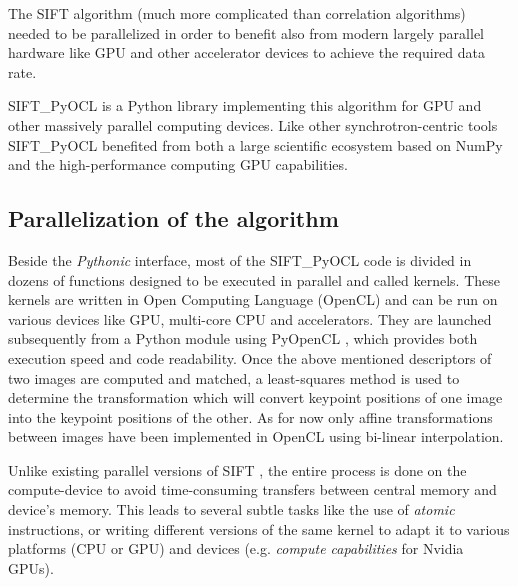 \documentclass[preprint]{iucr}
\begin{document}
The SIFT algorithm (much more complicated than correlation algorithms) needed
to be parallelized in order to benefit also from modern largely parallel
hardware like GPU and other accelerator devices to achieve the required data
rate.

SIFT\_PyOCL is a Python library implementing this algorithm for GPU
and other massively parallel computing devices.
Like other synchrotron-centric tools \cite{pyhst2,pynx,pyfai} SIFT_PyOCL
benefited from both a large scientific ecosystem based on NumPy \cite{numpy}
and the high-performance computing GPU capabilities.





\subsection{Parallelization of the algorithm}
Beside the \emph{Pythonic} interface, most of the
SIFT\_PyOCL code is divided in dozens of functions designed to be
executed in parallel and called kernels. These kernels are written in Open
Computing Language (OpenCL) \cite{opencl} and  can be run on various
devices like GPU, multi-core CPU and accelerators.
They are launched subsequently from a Python module using PyOpenCL
\cite{pyopencl}, which provides both execution speed and code readability.
Once the above mentioned descriptors of two images are computed and matched, a
least-squares method is used to determine the transformation which will convert
keypoint positions of one image into the keypoint positions of the other.
As for now only affine transformations between images have been implemented in
OpenCL using bi-linear interpolation.

Unlike existing parallel versions of SIFT \cite{lu,rister,vasilyev}, the entire
process is done on the compute-device to avoid time-consuming transfers between
central memory and device's memory.
This leads to several subtle tasks like the use of \emph{atomic} instructions,
or writing different versions of the same kernel to adapt it to various
platforms (CPU or GPU) and devices (e.g. \emph{compute capabilities} for
Nvidia GPUs).
\end{document}
